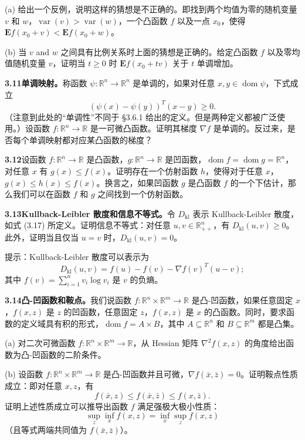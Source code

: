 \documentclass[UTF8,12pt,a4paper,fontset=fandol]{ctexart}
\DeclareMathOperator{\dom}{dom}
\begin{document}
(a) 给出一个反例，说明这样的猜想是不正确的。即找到两个均值为零的随机变量 $v$ 和 $w$，$\operatorname{var}(v)>\operatorname{var}(w)$，一个凸函数 $f$ 以及一点 $x_0$，使得 $\mathbf{E}f(x_0+v)<\mathbf{E}f(x_0+w)$。

(b) 当 $v$ and $w$ 之间具有比例关系时上面的猜想是正确的。给定凸函数 $f$ 以及零均值随机变量 $v$，证明当 $t\geq0$ 时 $\mathbf{E}f(x_0+tv)$ 关于 $t$ 单调增加。

\noindent\textbf{3.11\quad 单调映射。}\quad 称函数 $\psi:\mathbb{R}^n\to\mathbb{R}^n$ 是单调的，如果对任意 $x,y\in\dom\psi$，下式成立
\[
(\psi(x)-\psi(y))^T(x-y)\geq0.
\]
（注意到此处的“单调性”不同于 \S3.6.1 给出的定义。但是两种定义都被广泛使用。）设函数 $f:\mathbb{R}^n\to\mathbb{R}$ 是一可微凸函数。证明其梯度 $\nabla f$ 是单调的。反过来，是否每个单调映射都对应某凸函数的梯度？

\noindent\textbf{3.12}\quad 设函数 $f:\mathbb{R}^n\to\mathbb{R}$ 是凸函数，$g:\mathbb{R}^n\to\mathbb{R}$ 是凹函数，$\dom f=\dom g=\mathbb{R}^n$，对任意 $x$ 有 $g(x)\leq f(x)$。证明存在一个仿射函数 $h$，使得对于任意 $x$，$g(x)\leq h(x)\leq f(x)$。换言之，如果凹函数 $g$ 是凸函数 $f$ 的一个下估计，那么我们可以在函数 $f$ 和 $g$ 之间找到一个仿射函数。

\noindent\textbf{3.13\quad Kullback-Leibler 散度和信息不等式。}\quad 令 $D_{\mathrm{kl}}$ 表示 Kullback-Leibler 散度，如式 (3.17) 所定义。证明信息不等式：对任意 $u,v\in\mathbb{R}_{++}^n$，有 $D_{\mathrm{kl}}(u,v)\geq0$。此外，证明当且仅当 $u=v$ 时，$D_{\mathrm{kl}}(u,v)=0$。

提示：Kullback-Leibler 散度可以表示为
\[
D_{\mathrm{kl}}(u,v)=f(u)-f(v)-\nabla f(v)^T(u-v);
\]
其中 $f(v)=\sum_{i=1}^n v_i\log v_i$ 是 $v$ 的负熵。

\noindent\textbf{3.14\quad 凸-凹函数和鞍点。}\quad 我们说函数 $f:\mathbb{R}^n\times\mathbb{R}^m\to\mathbb{R}$ 是凸-凹函数，如果任意固定 $x$，$f(x,z)$ 是 $z$ 的凹函数，任意固定 $z$，$f(x,z)$ 是 $x$ 的凸函数。同时，要求函数的定义域具有积的形式，$\dom f=A\times B$，其中 $A\subseteq\mathbb{R}^n$ 和 $B\subseteq\mathbb{R}^m$ 都是凸集。

(a) 对二次可微函数 $f:\mathbb{R}^n\times\mathbb{R}^m\to\mathbb{R}$，从 Hessian 矩阵 $\nabla^2 f(x,z)$ 的角度给出函数为凸-凹函数的二阶条件。

(b) 设函数 $f:\mathbb{R}^n\times\mathbb{R}^m\to\mathbb{R}$ 是凸-凹函数并且可微，$\nabla f(\bar x,\bar z)=0$。证明鞍点性质成立：即对任意 $x,z$，有
\[
f(\bar x,z)\leq f(\bar x,\bar z)\leq f(x,\bar z).
\]
证明上述性质成立可以推导出函数 $f$ 满足强极大极小性质：
\[
\sup_z\inf_x f(x,z)=\inf_x\sup_z f(x,z)
\]
（且等式两端共同值为 $f(\bar x,\bar z)$）。
\end{document}
